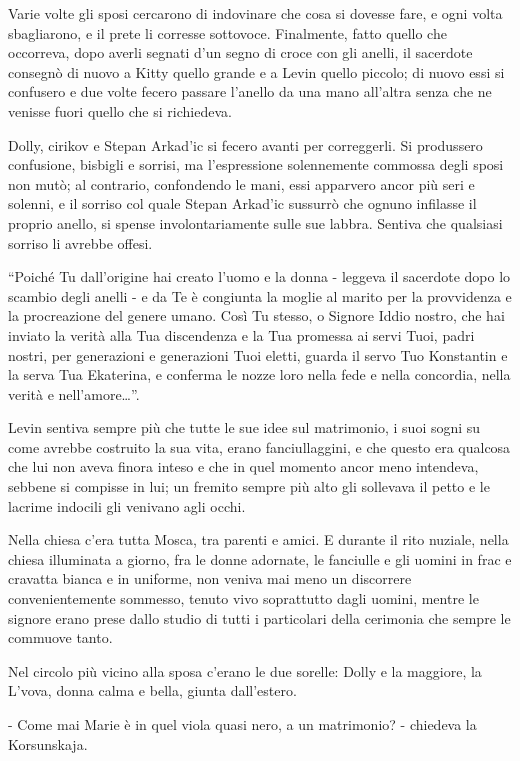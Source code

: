 Varie volte gli sposi cercarono di indovinare che cosa si dovesse fare, e ogni volta sbagliarono, e il prete li corresse sottovoce. Finalmente, fatto quello che occorreva, dopo averli segnati d'un segno di croce con gli anelli, il sacerdote consegnò di nuovo a Kitty quello grande e a Levin quello piccolo; di nuovo essi si confusero e due volte fecero passare l'anello da una mano all'altra senza che ne venisse fuori quello che si richiedeva. 

Dolly, cirikov e Stepan Arkad'ic si fecero avanti per correggerli. Si produssero confusione, bisbigli e sorrisi, ma l'espressione solennemente commossa degli sposi non mutò; al contrario, confondendo le mani, essi apparvero ancor più seri e solenni, e il sorriso col quale Stepan Arkad'ic sussurrò che ognuno infilasse il proprio anello, si spense involontariamente sulle sue labbra. Sentiva che qualsiasi sorriso li avrebbe offesi. 

``Poiché Tu dall'origine hai creato l'uomo e la donna - leggeva il sacerdote dopo lo scambio degli anelli - e da Te è congiunta la moglie al marito per la provvidenza e la procreazione del genere umano. Così Tu stesso, o Signore Iddio nostro, che hai inviato la verità alla Tua discendenza e la Tua promessa ai servi Tuoi, padri nostri, per generazioni e generazioni Tuoi eletti, guarda il servo Tuo Konstantin e la serva Tua Ekaterina, e conferma le nozze loro nella fede e nella concordia, nella verità e nell'amore\ldots{}''. 

Levin sentiva sempre più che tutte le sue idee sul matrimonio, i suoi sogni su come avrebbe costruito la sua vita, erano fanciullaggini, e che questo era qualcosa che lui non aveva finora inteso e che in quel momento ancor meno intendeva, sebbene si compisse in lui; un fremito sempre più alto gli sollevava il petto e le lacrime indocili gli venivano agli occhi. 

Nella chiesa c'era tutta Mosca, tra parenti e amici. E durante il rito nuziale, nella chiesa illuminata a giorno, fra le donne adornate, le fanciulle e gli uomini in frac e cravatta bianca e in uniforme, non veniva mai meno un discorrere convenientemente sommesso, tenuto vivo soprattutto dagli uomini, mentre le signore erano prese dallo studio di tutti i particolari della cerimonia che sempre le commuove tanto. 

Nel circolo più vicino alla sposa c'erano le due sorelle: Dolly e la maggiore, la L'vova, donna calma e bella, giunta dall'estero. 

- Come mai Marie è in quel viola quasi nero, a un matrimonio? - chiedeva la Korsunskaja. 

